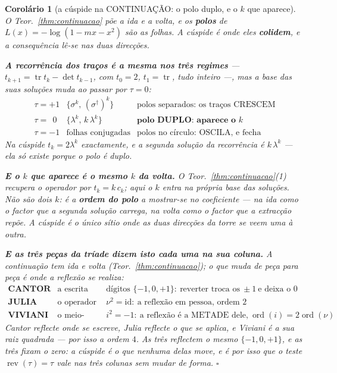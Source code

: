 \documentclass[11pt,a4paper]{article}
\newtheorem{corolario}[teorema]{Corolário}
\newcommand{\dg}{^{\dagger}}
\begin{document}
\begin{corolario}[a cúspide na CONTINUAÇÃO: o polo duplo, e o $k$ que
aparece]\label{cor:cuspide-continuacao}
O Teor.~\ref{thm:continuacao} põe a ida e a volta, e os \textbf{polos} de
$L(x)=-\log(1-mx-x^{2})$ são as folhas. A cúspide é onde eles \textbf{colidem}, e a
consequência lê-se nas duas direcções.

\textbf{A recorrência dos traços é a mesma nos três regimes} ---
$t_{k+1}=\operatorname{tr}t_k-\det t_{k-1}$, com $t_0=2$, $t_1=\operatorname{tr}$, tudo
inteiro ---, \emph{mas a base das suas soluções muda ao passar por $\tau=0$}:
\[
\begin{array}{lll}
\tau=+1 & \{\sigma^{k},\,(\sigma\dg)^{k}\} & \text{polos separados: os traços CRESCEM}\\
\tau=\ \ 0 & \{\lambda^{k},\,k\,\lambda^{k}\} & \textbf{polo DUPLO: aparece o }k\\
\tau=-1 & \text{folhas conjugadas} & \text{polos no círculo: OSCILA, e fecha}
\end{array}
\]
Na cúspide $t_k=2\lambda^{k}$ exactamente, e a segunda solução da recorrência é
$k\,\lambda^{k}$ --- ela \emph{só existe} porque o polo é duplo.

\textbf{E o $k$ que aparece é o mesmo $k$ da volta.} O Teor.~\ref{thm:continuacao}(1)
recupera o operador por $t_k=k\,c_k$; aqui o $k$ entra na própria base das soluções. Não são
dois $k$: é a \textbf{ordem do polo} a mostrar-se no coeficiente --- na ida como o
factor que a segunda solução carrega, na volta como o factor que a extracção repõe.
\emph{A cúspide é o único sítio onde as duas direcções da torre se veem uma à outra.}

\textbf{E as três peças da tríade dizem isto cada uma na sua coluna.} A continuação tem ida
e volta (Teor.~\ref{thm:continuacao}); o que muda de peça para peça é \emph{onde} a
reflexão se realiza:
\[
\begin{array}{lll}
\textbf{CANTOR} & \text{a escrita} & \text{dígitos }\{-1,0,+1\}:\ \text{reverter troca os}
\ \pm1\ \text{e deixa o }0\\[2pt]
\textbf{JULIA} & \text{o operador} & \nu^{2}=\mathrm{id}:\ \text{a reflexão em pessoa,
ordem }2\\[2pt]
\textbf{VIVIANI} & \text{o meio-ângulo} & i^{2}=-1:\ \text{a reflexão é a METADE dele,}
\ \operatorname{ord}(i)=2\operatorname{ord}(\nu)
\end{array}
\]
Cantor reflecte \emph{onde se escreve}, Julia reflecte \emph{o que se aplica}, e Viviani é
a sua raiz quadrada --- por isso a ordem $4$. \emph{As três reflectem o mesmo
$\{-1,0,+1\}$}, e as três fixam o zero: a cúspide é o que nenhuma delas move, e é por isso
que o teste $\operatorname{rev}(\tau)=\tau$ vale nas três colunas sem mudar de forma.
$\square$
\end{corolario}
\end{document}
